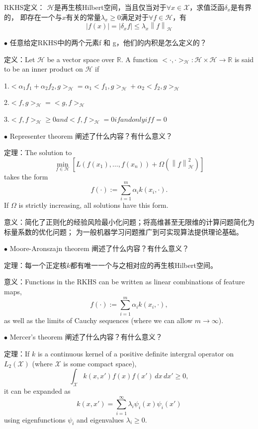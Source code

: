 \documentclass{ctexart}
\begin{document}
    RKHS定义：
    $\mathcal{H}$是再生核Hilbert空间，当且仅当对于$\forall x\in\mathcal{X}$，求值泛函$\delta_x$是有界的，
    即存在一个与$x$有关的常量$\lambda_x\geq 0$满足对于$\forall f\in\mathcal{H}$，有
    \[\left\lvert f(x)\right\rvert = \left\lvert \delta_x f\right\rvert \leq \lambda_{x}\left\lVert f\right\rVert_{\mathcal{H}} \]

    $\bullet$ 任意给定RKHS中的两个元素f 和 g，他们的内积是怎么定义的？
    
    定义：Let $\mathcal{H}$ be a vector space over $\mathbb{R}$. A function $<\cdot, \cdot>_{\mathcal{H}}: \mathcal{H}\times \mathcal{H}\rightarrow \mathbb{R}$ is said to be an inner product on $\mathcal{H}$ if
    
    1.$<\alpha_1f_1 + \alpha_2f_2, g>_{\mathcal{H}} = \alpha_1<f_1, g>_{\mathcal{H}} + \alpha_2<f_2, g>_{\mathcal{H}}$

    2.$<f, g>_{\mathcal{H}} = <g, f>_{\mathcal{H}}$

    3.$<f, f>_{\mathcal{H}}\geq 0 and <f, f>_{\mathcal{H}} = 0 if and only if f = 0$

    $\bullet$ Representer theorem 阐述了什么内容？有什么意义？

    定理：The solution to \[\min_{f\in\mathcal{H}}[L(f(x_1),\dots, f(x_n)) + \Omega(\left\lVert f\right\rVert_{\mathcal{H}}^2)]\]
    takes the form \[f(\cdot):=\sum_{i=1}^{m}\alpha_{i}k(x_i, \cdot).\]
    If $\Omega$ is strictly increasing, all solutions have this form.

    意义：简化了正则化的经验风险最小化问题；将高维甚至无限维的计算问题简化为标量系数的优化问题；
    为一般机器学习问题推广到可实现算法提供理论基础。

    $\bullet$ Moore-Aronszajn theorem 阐述了什么内容？有什么意义？

    定理：每一个正定核$k$都有唯一一个与之相对应的再生核Hilbert空间。

    意义：Functions in the RKHS can be written as linear combinations of feature maps,
    \[f(\cdot):=\sum_{i=1}^{m}\alpha_{i}k(x_i, \cdot),\]
    as well as the limits of Cauchy sequences (where we can allow $m\rightarrow \infty$).

    $\bullet$ Mercer's theorem 阐述了什么内容？有什么意义？

    定理：If $k$ is a continuous kernel of a positive definite intergral operator on $L_2(\mathcal{X})$ (where $\mathcal{X}$ is some compact space),
    \[\int_{\mathcal{X}} k(x, x') f(x)f(x')\,dx\,dx' \geq 0,\]
    it can be expanded as 
    \[k(x, x') = \sum_{i=1}^{\infty}\lambda_{i}\psi_{i}(x)\psi_{i}(x')\]
    using eigenfunctions $\psi_i$ and eigenvalues $\lambda_i \geq 0$.
    
\end{document}

